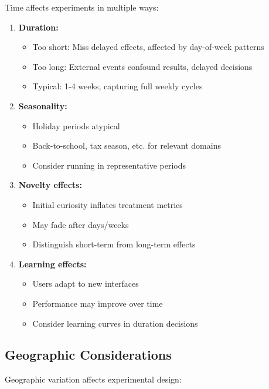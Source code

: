 Time affects experiments in multiple ways:

\begin{enumerate}
    \item \textbf{Duration:}
    \begin{itemize}
        \item Too short: Miss delayed effects, affected by day-of-week patterns
        \item Too long: External events confound results, delayed decisions
        \item Typical: 1-4 weeks, capturing full weekly cycles
    \end{itemize}

    \item \textbf{Seasonality:}
    \begin{itemize}
        \item Holiday periods atypical
        \item Back-to-school, tax season, etc. for relevant domains
        \item Consider running in representative periods
    \end{itemize}

    \item \textbf{Novelty effects:}
    \begin{itemize}
        \item Initial curiosity inflates treatment metrics
        \item May fade after days/weeks
        \item Distinguish short-term from long-term effects
    \end{itemize}

    \item \textbf{Learning effects:}
    \begin{itemize}
        \item Users adapt to new interfaces
        \item Performance may improve over time
        \item Consider learning curves in duration decisions
    \end{itemize}
\end{enumerate}

\subsection{Geographic Considerations}

Geographic variation affects experimental design:

